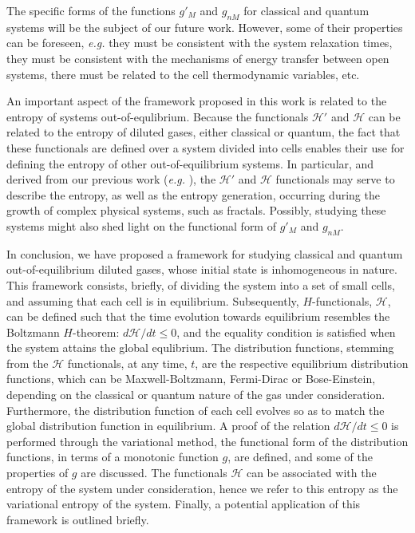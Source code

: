 The specific forms of the functions $g'_M$ and $g_{nM}$ for classical and quantum systems will be the
subject of our future work. However, some of their properties can be foreseen, \textit{e.g.} they must
be consistent with the system relaxation times, they must be consistent with the mechanisms of 
energy transfer between open systems, there must be related to the cell thermodynamic variables, etc.

An important aspect of the framework proposed in this work is related to the entropy of systems
out-of-equlibrium. Because the functionals $\mathcal{H}'$ and $\mathcal{H}$ can be related to
the entropy of diluted gases, either classical or quantum, the fact that these functionals are defined
over a system divided into cells enables their use for defining the entropy
of other out-of-equilibrium systems. In particular, and 
derived from our previous work (\textit{e.g.} \cite{bib:nicolas2020,bib:nicolas2016}), the
$\mathcal H'$ and $\mathcal H$ functionals may serve to describe the entropy,
as well as the entropy generation, occurring during the
growth of complex physical systems, such as fractals. Possibly, studying these systems might also
shed light on the functional form of $g'_M$ and $g_{nM}$.

In conclusion, we have proposed a framework for studying classical and quantum out-of-equilibrium
diluted gases, whose initial
state is inhomogeneous in nature. This framework consists, briefly, of dividing the system into
a set of small cells, and assuming that each cell is in equilibrium. Subsequently,
$H$-functionals, $\mathcal H$, can be defined
such that the time evolution towards equilibrium resembles the Boltzmann $H$-theorem: $d\mathcal H/dt\leq0$,
and the equality condition is satisfied when the system attains the global equlibrium.
The distribution functions,
stemming from the $\mathcal H$ functionals, at any time, $t$, are the respective equilibrium distribution functions,
which can be Maxwell-Boltzmann, Fermi-Dirac or Bose-Einstein, depending on the classical or quantum nature
of the gas under consideration. Furthermore,
the distribution function of each cell evolves so as to match the global distribution function in equilibrium.
A proof of the relation $d\mathcal H/dt\leq0$ is performed through the variational method,
the functional form of the distribution
functions, in terms of a monotonic function $g$, are defined, and some of the properties of $g$ are discussed.
The functionals $\mathcal H$ can be associated with the entropy of the system under consideration, hence we
refer to this entropy as the variational entropy of the system. Finally,
a potential application of this framework is outlined briefly. 





